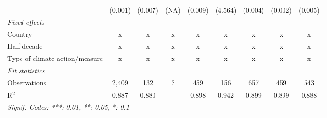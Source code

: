 \begin{table}[htbp]
\begin{tabular}{lcccccccc}
                                                                      & (0.001)       & (0.007)                   & (NA)         & (0.009)        & (4.564)          & (0.004)         & (0.002)         & (0.005)\\   
      \emph{Fixed effects}\\
      Country                                                         & x             & x                         & x            & x              & x                & x               & x               & x\\  
      Half decade                                                     & x             & x                         & x            & x              & x                & x               & x               & x\\  
      Type of climate action/measure                                  & x             & x                         & x            & x              & x                & x               & x               & x\\  
      \midrule \emph{Fit statistics}\\
      Observations                                                    & 2,409         & 132                       & 3            & 459            & 156              & 657             & 459             & 543\\  
      R$^2$                                                           & 0.887         & 0.880                     &              & 0.898          & 0.942            & 0.899           & 0.899           & 0.888\\  
      \midrule
      \multicolumn{9}{l}{\emph{Signif. Codes: ***: 0.01, **: 0.05, *: 0.1}}\\
   \end{tabular}
\end{table}


